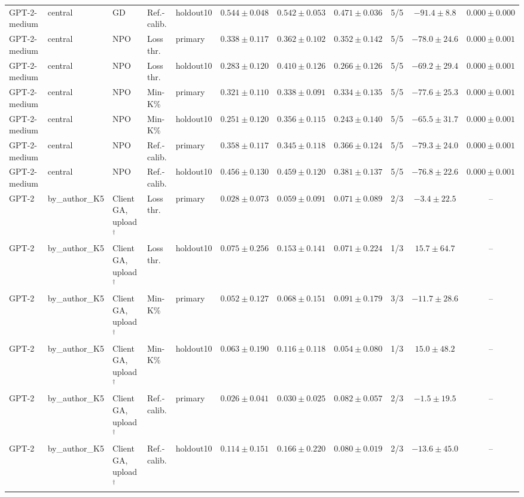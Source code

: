 {\begin{longtable}{@{\extracolsep{\fill}}lllllcccccc@{}}
GPT-2-medium & central & GD & Ref.-calib. & holdout10 & $0.544 \pm 0.048$ & $0.542 \pm 0.053$ & $0.471 \pm 0.036$ & 5/5 & $-91.4 \pm 8.8$ & $0.000 \pm 0.000$ \\
GPT-2-medium & central & NPO & Loss thr. & primary & $0.338 \pm 0.117$ & $0.362 \pm 0.102$ & $0.352 \pm 0.142$ & 5/5 & $-78.0 \pm 24.6$ & $0.000 \pm 0.001$ \\
GPT-2-medium & central & NPO & Loss thr. & holdout10 & $0.283 \pm 0.120$ & $0.410 \pm 0.126$ & $0.266 \pm 0.126$ & 5/5 & $-69.2 \pm 29.4$ & $0.000 \pm 0.001$ \\
GPT-2-medium & central & NPO & Min-K\% & primary & $0.321 \pm 0.110$ & $0.338 \pm 0.091$ & $0.334 \pm 0.135$ & 5/5 & $-77.6 \pm 25.3$ & $0.000 \pm 0.001$ \\
GPT-2-medium & central & NPO & Min-K\% & holdout10 & $0.251 \pm 0.120$ & $0.356 \pm 0.115$ & $0.243 \pm 0.140$ & 5/5 & $-65.5 \pm 31.7$ & $0.000 \pm 0.001$ \\
GPT-2-medium & central & NPO & Ref.-calib. & primary & $0.358 \pm 0.117$ & $0.345 \pm 0.118$ & $0.366 \pm 0.124$ & 5/5 & $-79.3 \pm 24.0$ & $0.000 \pm 0.001$ \\
GPT-2-medium & central & NPO & Ref.-calib. & holdout10 & $0.456 \pm 0.130$ & $0.459 \pm 0.120$ & $0.381 \pm 0.137$ & 5/5 & $-76.8 \pm 22.6$ & $0.000 \pm 0.001$ \\
GPT-2 & by\_author\_K5 & Client GA, upload$^{\dagger}$ & Loss thr. & primary & $0.028 \pm 0.073$ & $0.059 \pm 0.091$ & $0.071 \pm 0.089$ & 2/3 & $-3.4 \pm 22.5$ & -- \\
GPT-2 & by\_author\_K5 & Client GA, upload$^{\dagger}$ & Loss thr. & holdout10 & $0.075 \pm 0.256$ & $0.153 \pm 0.141$ & $0.071 \pm 0.224$ & 1/3 & $15.7 \pm 64.7$ & -- \\
GPT-2 & by\_author\_K5 & Client GA, upload$^{\dagger}$ & Min-K\% & primary & $0.052 \pm 0.127$ & $0.068 \pm 0.151$ & $0.091 \pm 0.179$ & 3/3 & $-11.7 \pm 28.6$ & -- \\
GPT-2 & by\_author\_K5 & Client GA, upload$^{\dagger}$ & Min-K\% & holdout10 & $0.063 \pm 0.190$ & $0.116 \pm 0.118$ & $0.054 \pm 0.080$ & 1/3 & $15.0 \pm 48.2$ & -- \\
GPT-2 & by\_author\_K5 & Client GA, upload$^{\dagger}$ & Ref.-calib. & primary & $0.026 \pm 0.041$ & $0.030 \pm 0.025$ & $0.082 \pm 0.057$ & 2/3 & $-1.5 \pm 19.5$ & -- \\
GPT-2 & by\_author\_K5 & Client GA, upload$^{\dagger}$ & Ref.-calib. & holdout10 & $0.114 \pm 0.151$ & $0.166 \pm 0.220$ & $0.080 \pm 0.019$ & 2/3 & $-13.6 \pm 45.0$ & -- \\

\end{longtable}}
